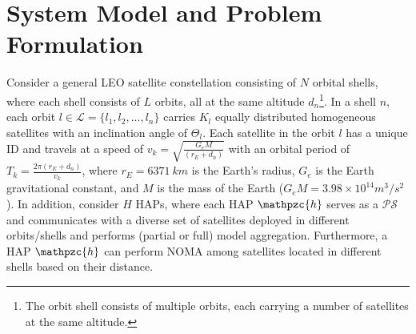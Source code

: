 \documentclass[letter,journal]{IEEEtran}
\begin{document}

\section{System Model and Problem Formulation}\label{sec:model}

Consider a general LEO satellite constellation consisting of $N$ orbital shells, where each shell consists of $L$ orbits, all at the same altitude $d_n$\footnote{The orbit shell consists of multiple orbits, each carrying a number of satellites at the same altitude.}. In a shell $n$, each orbit $l \in \mathcal{L}=\{l_1,l_2,...,l_n\}$ carries $K_{l}$ equally distributed homogeneous satellites with an inclination angle of $ \Theta_{l}$. Each satellite in the orbit $l$ has a unique ID and travels at a speed of $v_{k}=\sqrt{\frac{G_e M}{(r_{E}+d_n)}}$ with an orbital period of $T_{k}= \frac{2 \pi (r_{E}+d_n)}{v_{k}}$, where $r_{E}=6371~km$ is the Earth's radius, $G_e$ is the Earth gravitational constant, and $M$ is the mass of the Earth ($G_e M= 3.98\times 10^{14} m^{3}/s^{2}$). In addition, consider $H$ HAPs, where each HAP $\mathpzc{h}$ serves as a $\mathcal {PS}$ and communicates with a diverse set of satellites deployed in different orbits/shells and performs (partial or full) model aggregation. Furthermore, a HAP $\mathpzc{h}$ can perform NOMA among satellites located in different shells based on their distance. 
\end{document}
